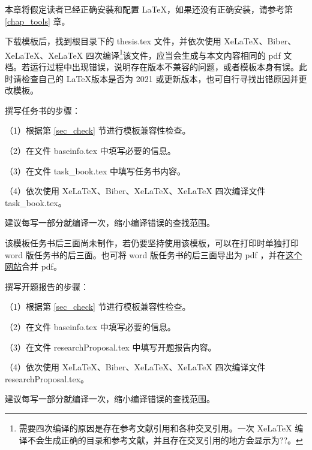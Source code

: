 \newcommand{\filename}[1]{\colorbox[RGB]{222,222,222}{\mbox{#1}}}
\newcommand{\hltext}[1]{\colorbox[RGB]{237,250,0}{#1}}  %

\label{chap:模板使用说明}
本章将假定读者已经正确安装和配置 \LaTeX ，如果还没有正确安装，请参考第 \ref{chap_tools} 章。

\label{sec_check}  %
下载模板后，找到根目录下的 \filename{thesis.tex} 文件，并依次使用 XeLaTeX、Biber、XeLaTeX、XeLaTeX 四次编译\footnote{需要四次编译的原因是存在参考文献引用和各种交叉引用。一次 XeLaTeX 编译不会生成正确的目录和参考文献，并且存在交叉引用的地方会显示为??。}该文件，应当会生成与本文内容相同的 pdf 文档。若运行过程中出现错误，说明存在版本不兼容的问题，或者模板本身有误。此时请检查自己的 \LaTeX 版本是否为 2021 或更新版本，也可自行寻找出错原因并更改模板。


撰写任务书的步骤：

  （1）根据第 \ref{sec_check} 节进行模板兼容性检查。

  （2）在文件 \filename{baseinfo.tex} 中填写必要的信息。

  （3）在文件 \filename{task\_book.tex} 中填写任务书内容。

  （4）依次使用 XeLaTeX、Biber、XeLaTeX、XeLaTeX 四次编译文件 \filename{task\_book.tex}。

建议每写一部分就编译一次，缩小编译错误的查找范围。

\hltext{该模板任务书后三面尚未制作}，若仍要坚持使用该模板，可以在打印时单独打印 word 版任务书的后三面。也可将  word 版任务书的后三面导出为 pdf ，并在\href{https://www.ilovepdf.com/zh-cn/merge_pdf}{这个网站}合并 pdf。


撰写开题报告的步骤：

（1）根据第 \ref{sec_check} 节进行模板兼容性检查。

（2）在文件 \filename{baseinfo.tex} 中填写必要的信息。

（3）在文件 \filename{researchProposal.tex} 中填写开题报告内容。

（4）依次使用 XeLaTeX、Biber、XeLaTeX、XeLaTeX 四次编译文件 \filename{researchProposal.tex}。

建议每写一部分就编译一次，缩小编译错误的查找范围。

